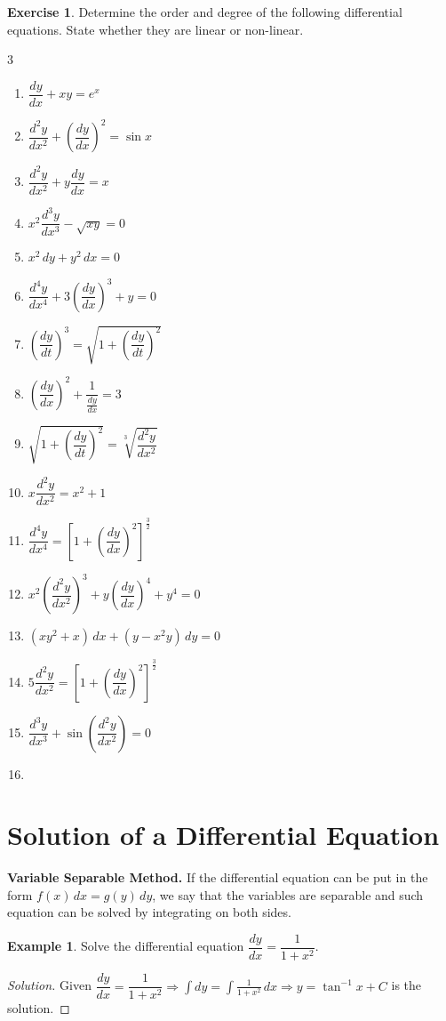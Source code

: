 \documentclass{book}
\theoremstyle{definition}
\newtheorem{exercise}{Exercise}[section]
\newtheorem{example}{Example}[section]
\newenvironment{solution}
    {\begin{proof}[Solution]}
    {\end{proof}}
\begin{document}
\begin{exercise}
Determine the order and degree of the following differential equations. State whether they are linear or non-linear. 
\begin{multicols}{3}
\begin{enumerate}[label=(\roman*)]
    \item $\dfrac{dy}{dx}+xy=e^x$
    \item $\dfrac{d^2y}{dx^2}+\left(\dfrac{dy}{dx}\right)^2=\sin x$
    \item $\dfrac{d^2y}{dx^2}+y\dfrac{dy}{dx}= x$
    \item $x^2\dfrac{d^3y}{dx^3}-\sqrt{xy}= 0$
    \item $x^2\,dy+y^2\,dx=0$
    \item $\dfrac{d^4y}{dx^4}+3\left(\dfrac{dy}{dx}\right)^3+y=0$
    \item $\left(\dfrac{dy}{dt}\right)^3=\sqrt{1+\left(\dfrac{dy}{dt}\right)^2}$
    \item $\left(\dfrac{dy}{dx}\right)^2+\dfrac{1}{\frac{dy}{dx}}=3$
    \item $\sqrt{1+\left(\dfrac{dy}{dt}\right)^2}=\sqrt[3]{\dfrac{d^2y}{dx^2}}$
    \item $x\dfrac{d^2y}{dx^2}=x^2+1$
    \item $\dfrac{d^4y}{dx^4}=\left[1+\left(\dfrac{dy}{dx}\right)^2\right]^{\frac{3}{2}}$
    \item $x^2\left(\dfrac{d^2y}{dx^2}\right)^3+y\left(\dfrac{dy}{dx}\right)^4+y^4=0$
    \item $(xy^2+x)\,dx+(y-x^2y)\,dy=0$
    \item $5\dfrac{d^2y}{dx^2}=\left[1+\left(\dfrac{dy}{dx}\right)^2\right]^{\frac{3}{2}}$
    \item $\dfrac{d^3y}{dx^3}+\sin \left(\dfrac{d^2y}{dx^2}\right)=0$
    \item[] \phantom{x}
\end{enumerate}
\end{multicols}
\end{exercise}

\section{Solution of a Differential Equation}
\textbf{Variable Separable Method.} If the differential equation can be put in the form $f(x)\,dx=g(y)\,dy$, we say that the variables are separable and such equation can be solved by integrating on both sides.

\begin{example}
Solve the differential equation $\dfrac{dy}{dx}=\dfrac{1}{1+x^2}$.
\end{example}
\begin{solution}
Given $\dfrac{dy}{dx}=\dfrac{1}{1+x^2} \Rightarrow \displaystyle\int dy=\displaystyle\int\frac{1}{1+x^2}\,dx \Rightarrow y=\tan^{-1}x+C$ is the solution.    
\end{solution}
\end{document}
